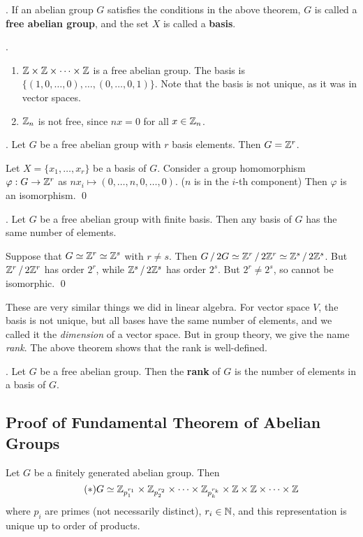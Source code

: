 .  If an abelian group \(G\) satisfies the conditions in the above theorem, \(G\) is called a \textbf{free abelian group}, and the set \(X\) is called a \textbf{basis}.

\ex.
\begin{enumerate}
    \item \(\mathbb{Z} \times \mathbb{Z} \times \cdots \times \mathbb{Z}\) is a free abelian group. The basis is \(\{(1, 0, \dots, 0), \dots, (0, \dots, 0, 1)\}\). Note that the basis is not unique, as it was in vector spaces.
    \item \(\mathbb{Z}_n\) is not free, since \(nx = 0\) for all \(x \in \mathbb{Z}_n\).
\end{enumerate}

\thm. Let \(G\) be a free abelian group with \(r\) basis elements. Then \(G = \mathbb{Z}^r\).

\pf Let \(X = \{x_1, \dots, x_r\}\) be a basis of \(G\). Consider a group homomorphism \(\varphi : G \rightarrow \mathbb{Z}^r\) as \(nx_i \mapsto (0, \dots, n, 0, \dots, 0)\). (\(n\) is in the \(i\)-th component) Then \(\varphi\) is an isomorphism. \qed

\pagebreak

\thm. Let \(G\) be a free abelian group with finite basis. Then any basis of \(G\) has the same number of elements.

\pf Suppose that \(G \simeq \mathbb{Z}^r \simeq \mathbb{Z}^s\) with \(r\neq s\). Then \(G \operatorname{/} 2G \simeq \mathbb{Z}^r \operatorname{/} 2\mathbb{Z}^r \simeq \mathbb{Z}^s \operatorname{/} 2\mathbb{Z}^s\). But \(\mathbb{Z}^r \operatorname{/} 2\mathbb{Z}^r\) has order \(2^r\), while \(\mathbb{Z}^s \operatorname{/} 2\mathbb{Z}^s\) has order \(2^s\). But \(2^r \neq 2^s\), so cannot be isomorphic. \qed

These are very similar things we did in linear algebra. For vector space \(V\), the basis is not unique, but all bases have the same number of elements, and we called it the \textit{dimension} of a vector space. But in group theory, we give the name \textit{rank}. The above theorem shows that the rank is well-defined.

.  Let \(G\) be a free abelian group. Then the \textbf{rank} of \(G\) is the number of elements in a basis of \(G\).

\subsection*{Proof of Fundamental Theorem of Abelian Groups}

\recall Let \(G\) be a finitely generated abelian group. Then
\[ \tag{\mast}
    G \simeq \Z_{p_1^{r_1}} \times \Z_{p_2^{r_2}} \times \cdots \times \Z_{p_k^{r_k}} \times \Z \times \Z \times \cdots \times \Z
\]
where \(p_i\) are primes (not necessarily distinct), \(r_i \in \mathbb{N}\), and this representation is unique up to order of products.

